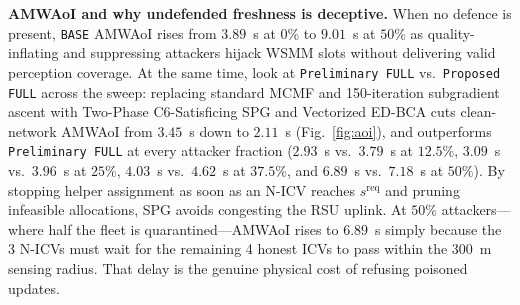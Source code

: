 \documentclass[conference]{IEEEtran}
\begin{document}
\textbf{AMWAoI and why undefended freshness is deceptive.} When no defence is present, \texttt{BASE} AMWAoI rises from $3.89$~s at $0\%$ to $9.01$~s at $50\%$ as quality-inflating and suppressing attackers hijack WSMM slots without delivering valid perception coverage. At the same time, look at \texttt{Preliminary FULL} vs.\ \texttt{Proposed FULL} across the sweep: replacing standard MCMF and 150-iteration subgradient ascent with Two-Phase C6-Satisficing SPG and Vectorized ED-BCA cuts clean-network AMWAoI from $3.45$~s down to $2.11$~s (Fig.~\ref{fig:aoi}), and outperforms \texttt{Preliminary FULL} at every attacker fraction ($2.93$~s vs.\ $3.79$~s at $12.5\%$, $3.09$~s vs.\ $3.96$~s at $25\%$, $4.03$~s vs.\ $4.62$~s at $37.5\%$, and $6.89$~s vs.\ $7.18$~s at $50\%$). By stopping helper assignment as soon as an N-ICV reaches $s^{\mathrm{req}}$ and pruning infeasible allocations, SPG avoids congesting the RSU uplink. At $50\%$ attackers---where half the fleet is quarantined---AMWAoI rises to $6.89$~s simply because the 3 N-ICVs must wait for the remaining 4 honest ICVs to pass within the 300~m sensing radius. That delay is the genuine physical cost of refusing poisoned updates.
\end{document}
